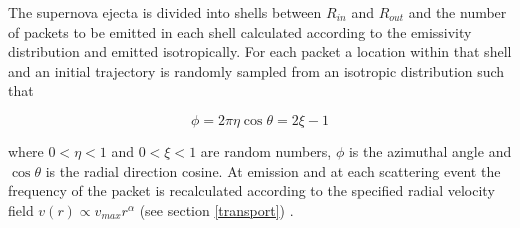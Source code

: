 \documentclass[useAMS,usenatbib,usegraphicx]{mnras}
\begin{document}
The supernova ejecta is divided into shells between $R_{in}$ and $R_{out}$ 
and the number of packets to be emitted in each shell calculated according 
to the emissivity distribution and emitted isotropically.  For each packet 
a location within that shell and an initial trajectory is randomly sampled 
from an isotropic distribution such that

\begin{equation}
\phi=2\pi\eta
 \cos \theta=2\xi -1
\end{equation}

\noindent where $0<\eta<1$ and $0<\xi<1$ are random numbers, $\phi$ is the 
azimuthal angle and $\cos \theta$ is the radial direction cosine.  At 
emission and at each scattering event the frequency of the packet is 
recalculated according to the specified radial velocity field $v(r) 
\propto v_{max}r^{\alpha}$ (see section \ref{transport}) .
\end{document}
